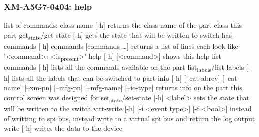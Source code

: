 \documentclass[11pt]{article}
\begin{document}
\subsubsection{XM-A5G7-0404: help}
\label{sec:org6baa38a}
list of commands:
  class-name [-h]
    returns the class name of the part class this part
  get\textsubscript{state}/get-state [-h]
    gets the state that will be written to switch
  has-commands [-h] commands [commands \ldots{}]
    returns a list of lines each look like '<command>: <is\textsubscript{present}>'
  help [-h] [<command>]
    shows this help
  list-commands [-h]
    lists all the commands available on the part
  list\textsubscript{labels}/list-labels [-h]
    lists all the labels that can be switched to
  part-info  [-h] [--cat-abrev] [--cat-name] [--xm-pn] [--mfg-pn] [--mfg-name]
          [--io-type]
    returns info on the part this control screen was designed for
  set\textsubscript{state}/set-state [-h] <label>
    sets the state that will be written to the switch
  virt-write [-h] [-i <event type>] [-f <bool>]
    instead of writting to spi bus, instead write to a virtual spi bus
    and return the log output
  write [-h]
    writes the data to the device
\end{document}
